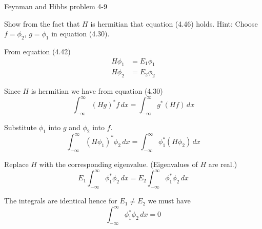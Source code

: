 \documentclass[12pt]{article}
\begin{document}
\begin{center}
Feynman and Hibbs problem 4-9
\end{center}

Show from the fact that $H$ is hermitian that equation (4.46) holds.
Hint: Choose $f=\phi_2$, $g=\phi_1$ in equation (4.30).

\bigskip
From equation (4.42)
\begin{align*}
H\phi_1&=E_1\phi_1
\\
H\phi_2&=E_2\phi_2
\end{align*}

Since $H$ is hermitian we have from equation (4.30)
\begin{equation*}
\int_{-\infty}^\infty(Hg)^*f\,dx=\int_{-\infty}^\infty g^*(Hf)\,dx
\tag{4.30}
\end{equation*}

Substitute $\phi_1$ into $g$ and $\phi_2$ into $f$.
\begin{equation*}
\int_{-\infty}^\infty(H\phi_1)^*\phi_2\,dx=\int_{-\infty}^\infty \phi_1^*(H\phi_2)\,dx
\end{equation*}

Replace $H$ with the corresponding eigenvalue.
(Eigenvalues of $H$ are real.)
\begin{equation*}
E_1\int_{-\infty}^\infty\phi_1^*\phi_2\,dx=E_2\int_{-\infty}^\infty \phi_1^*\phi_2\,dx
\end{equation*}

The integrals are identical hence for $E_1\ne E_2$ we must have
\begin{equation*}
\int_{-\infty}^\infty\phi_1^*\phi_2\,dx=0
\end{equation*}
\end{document}
